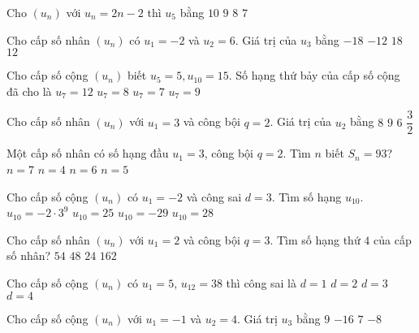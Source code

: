 \begin{ex}
Cho $(u_n)$ với $u_n=2n-2$ thì $u_5$ bằng
\choice
{$10$}
{$9$}
{\True $8$}
{$7$}
\end{ex}
\begin{ex}
Cho cấp số nhân $(u_n)$ có $u_1=-2$ và $u_2=6$. Giá trị của $u_3$ bằng
\choice
{\True $-18$}
{$-12$}
{$18$}
{$12$}
\end{ex}
\begin{ex}
Cho cấp số cộng $(u_n)$ biết $u_5=5, u_{10}=15$. Số hạng thứ bảy của cấp số cộng đã cho là
\choice
{$u_7=12$}
{$u_7=8$}
{$u_7=7$}
{\True $u_7=9$}
\end{ex}
\begin{ex}
Cho cấp số nhân $(u_n)$ với $u_1=3$ và công bội $q=2$. Giá trị của $u_2$ bằng
\choice
{$8$}
{$9$}
{\True $6$}
{$\dfrac{3}{2}$}
\end{ex}
\begin{ex}
Một cấp số nhân có số hạng đầu $u_1=3$, công bội $q=2$. Tìm $n$ biết $S_n=93$?
\choice
{$n=7$}
{$n=4$}
{$n=6$}
{\True $n=5$}
\end{ex}
\begin{ex}
Cho cấp số cộng $(u_n)$ có $u_1=-2$ và công sai $d=3$. Tìm số hạng $u_{10}$.
\choice
{$u_{10}=-2 \cdot 3^9$}
{\True $u_{10}=25$}
{$u_{10}=-29$}
{$u_{10}=28$}
\end{ex}
\begin{ex}
Cho cấp số nhân $(u_n)$ với $u_1=2$ và công bội $q=3$. Tìm số hạng thứ $4$ của cấp số nhân?
\choice
{\True $54$}
{$48$}
{$24$}
{$162$}
\end{ex}
\begin{ex}
Cho cấp số cộng $(u_n)$ có $u_1=5$, $u_{12}=38$ thì công sai là
\choice
{$d=1$}
{$d=2$}
{\True $d=3$}
{$d=4$}
\end{ex}
\begin{ex}
Cho cấp số cộng $(u_n)$ với $u_1=-1$ và $u_2=4$. Giá trị $u_3$ bằng
\choice
{\True $9$}
{$-16$}
{$7$}
{$-8$}
\end{ex}
